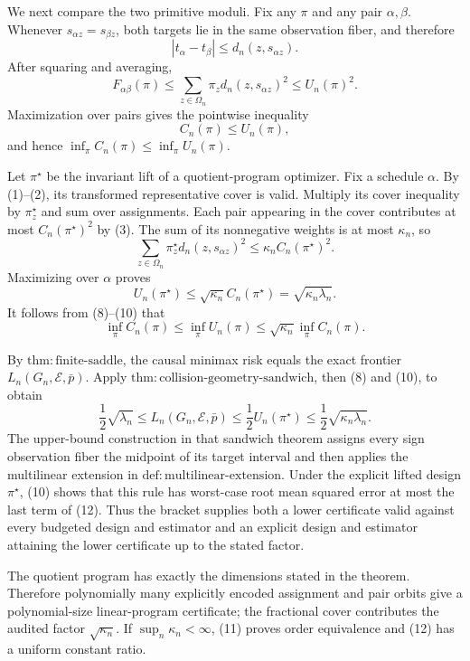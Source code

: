 We next compare the two primitive moduli.  Fix any \(\pi\) and any pair \(\alpha,\beta\).  Whenever \(s_{\alpha z}=s_{\beta z}\), both targets lie in the same observation fiber, and therefore
\[
 |t_\alpha-t_\beta|
 \le d_n(z,s_{\alpha z}).
\]
After squaring and averaging,
\[
 F_{\alpha\beta}(\pi)
 \le\sum_{z\in\Omega_n}\pi_zd_n(z,s_{\alpha z})^2
 \le U_n(\pi)^2.
\]
Maximization over pairs gives the pointwise inequality
\[
 C_n(\pi)\le U_n(\pi), \tag{9}
\]
and hence \(\inf_\pi C_n(\pi)\le\inf_\pi U_n(\pi)\).

Let \(\pi^\star\) be the invariant lift of a quotient-program optimizer.  Fix a schedule \(\alpha\).  By (1)--(2), its transformed representative cover is valid.  Multiply its cover inequality by \(\pi_z^\star\) and sum over assignments.  Each pair appearing in the cover contributes at most \(C_n(\pi^\star)^2\) by (3).  The sum of its nonnegative weights is at most \(\kappa_n\), so
\[
 \sum_{z\in\Omega_n}\pi_z^\star d_n(z,s_{\alpha z})^2
 \le\kappa_n C_n(\pi^\star)^2.
\]
Maximizing over \(\alpha\) proves
\[
 U_n(\pi^\star)
 \le\sqrt{\kappa_n}C_n(\pi^\star)
 =\sqrt{\kappa_n\lambda_n}. \tag{10}
\]
It follows from (8)--(10) that
\[
 \inf_\pi C_n(\pi)
 \le\inf_\pi U_n(\pi)
 \le\sqrt{\kappa_n}\inf_\pi C_n(\pi). \tag{11}
\]

By \(\mathrm{thm{:}finite\text{-}saddle}\), the causal minimax risk equals the exact frontier \(L_n(G_n,\mathcal E,\bar p)\).  Apply \(\mathrm{thm{:}collision\text{-}geometry\text{-}sandwich}\), then (8) and (10), to obtain
\[
 \frac12\sqrt{\lambda_n}
 \le L_n(G_n,\mathcal E,\bar p)
 \le\frac12U_n(\pi^\star)
 \le\frac12\sqrt{\kappa_n\lambda_n}. \tag{12}
\]
The upper-bound construction in that sandwich theorem assigns every sign observation fiber the midpoint of its target interval and then applies the multilinear extension in \(\mathrm{def{:}multilinear\text{-}extension}\).  Under the explicit lifted design \(\pi^\star\), (10) shows that this rule has worst-case root mean squared error at most the last term of (12).  Thus the bracket supplies both a lower certificate valid against every budgeted design and estimator and an explicit design and estimator attaining the lower certificate up to the stated factor.

The quotient program has exactly the dimensions stated in the theorem.  Therefore polynomially many explicitly encoded assignment and pair orbits give a polynomial-size linear-program certificate; the fractional cover contributes the audited factor \(\sqrt{\kappa_n}\).  If \(\sup_n\kappa_n<\infty\), (11) proves order equivalence and (12) has a uniform constant ratio.

